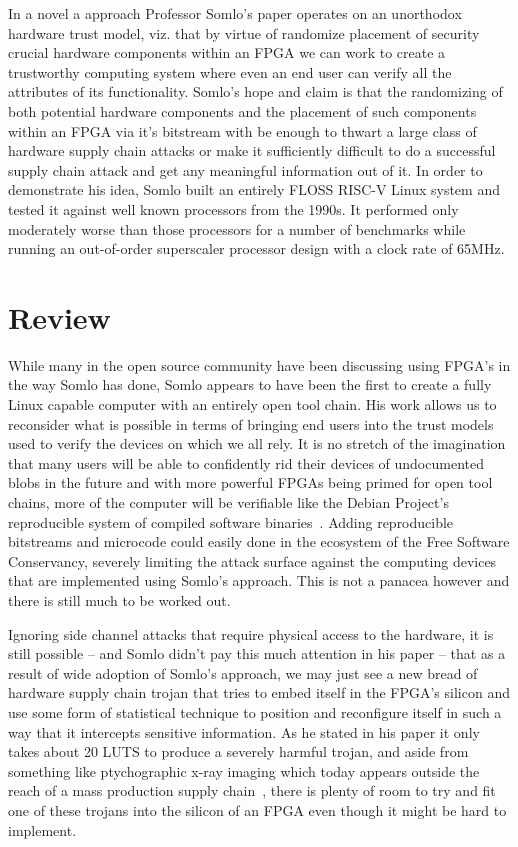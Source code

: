 \documentclass[conference]{IEEEtran}
\begin{document}
In a novel a approach Professor Somlo’s paper operates on an unorthodox hardware trust model, viz. that by virtue of randomize placement of security crucial hardware components within an FPGA we can work to create a trustworthy computing system where even an end user can verify all the attributes of its functionality. Somlo’s hope and claim is that the randomizing of both potential hardware components and the placement of such components within an FPGA via it’s bitstream with be enough to thwart a large class of hardware supply chain attacks or make it sufficiently difficult to do a successful supply chain attack and get any meaningful information out of it. In order to demonstrate his idea, Somlo built an entirely FLOSS RISC-V Linux system and tested it against well known processors from the 1990s. It performed only moderately worse than those processors for a number of benchmarks while running an out-of-order superscaler processor design with a clock rate of 65MHz.

\section{Review}
While many in the open source community have been discussing using FPGA’s in the way Somlo has done, Somlo appears to have been the first to create a fully Linux capable computer with an entirely open tool chain. His work allows us to reconsider what is possible in terms of bringing end users into the trust models used to verify the devices on which we all rely. It is no stretch of the imagination that many users will be able to confidently rid their devices of undocumented blobs in the future and with more powerful FPGAs being primed for open tool chains, more of the computer will be verifiable like the Debian Project’s reproducible system of compiled software binaries~\cite{reproducible}. Adding reproducible bitstreams and microcode could easily done in the ecosystem of the Free Software Conservancy, severely limiting the attack surface against the computing devices that are implemented using Somlo’s approach. This is not a panacea however and there is still much to be worked out.

Ignoring side channel attacks that require physical access to the hardware, it is still possible – and Somlo didn’t pay this much attention in his paper – that as a result of wide adoption of Somlo’s approach, we may just see a new bread of hardware supply chain trojan that tries to embed itself in the FPGA’s silicon and use some form of statistical technique to position and reconfigure itself in such a way that it intercepts sensitive information. As he stated in his paper it only takes about 20 LUTS to produce a severely harmful trojan, and aside from something like ptychographic x-ray imaging which today appears outside the reach of a mass production supply chain~\cite{holler}, there is plenty of room to try and fit one of these trojans into the silicon of an FPGA even though it might be hard to implement.
\end{document}
